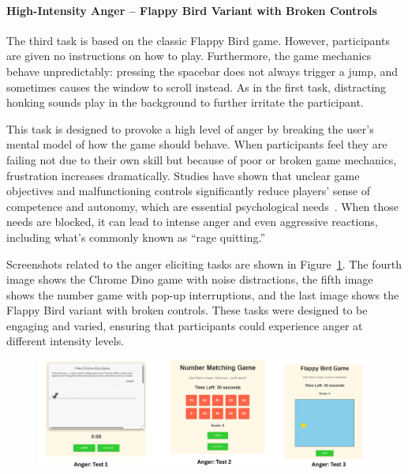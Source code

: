 \paragraph*{High-Intensity Anger – Flappy Bird Variant with Broken Controls}

The third task is based on the classic Flappy Bird game. However, participants are given no instructions on how to play. Furthermore, the game mechanics behave unpredictably: pressing the spacebar does not always trigger a jump, and sometimes causes the window to scroll instead. As in the first task, distracting honking sounds play in the background to further irritate the participant.

This task is designed to provoke a high level of anger by breaking the user’s mental model of how the game should behave. When participants feel they are failing not due to their own skill but because of poor or broken game mechanics, frustration increases dramatically. Studies have shown that unclear game objectives and malfunctioning controls significantly reduce players' sense of competence and autonomy, which are essential psychological needs~\citep{bevilacqua2019game}. When those needs are blocked, it can lead to intense anger and even aggressive reactions, including what’s commonly known as “rage quitting.”

Screenshots related to the anger eliciting tasks are shown in Figure~\ref{fig:task-angry}. The fourth image shows the Chrome Dino game with noise distractions, the fifth image shows the number game with pop-up interruptions, and the last image shows the Flappy Bird variant with broken controls. These tasks were designed to be engaging and varied, ensuring that participants could experience anger at different intensity levels.

\begin{figure}[h]
    \centering
    \includegraphics[width=1\textwidth]{img/chapter_03/angry_tests.png}
    \label{fig:task-angry}
\end{figure}

